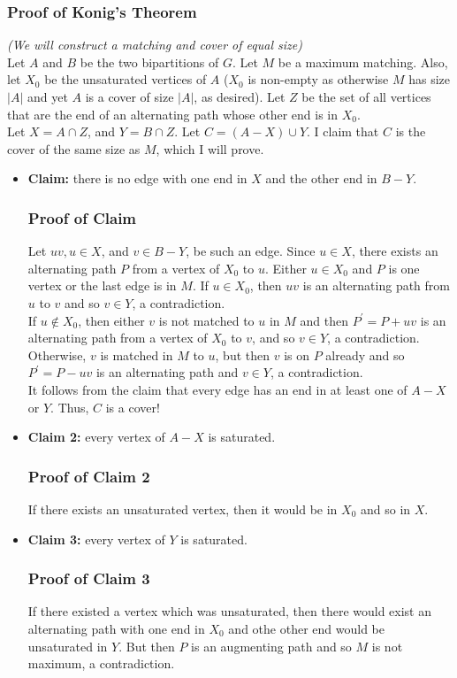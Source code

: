 \documentclass{report}
\begin{document}
\subsubsection{Proof of Konig's Theorem}
\textit{(We will construct a matching and cover of equal size)}\\
Let $A$ and $B$ be the two bipartitions of $G$. Let $M$ be a maximum matching. Also, let $X_0$ be the unsaturated vertices of $A$ ($X_0$ is non-empty as otherwise $M$ has size $|A|$ and yet $A$ is a cover of size $|A|$, as desired). Let $Z$ be the set of all vertices that are the end of an alternating path whose other end is in $X_0$.\\ Let $X = A \cap Z$, and $Y = B \cap Z$. Let $C = (A - X) \cup Y$. I claim that $C$ is the cover of the same size as $M$, which I will prove.
\begin{itemize}
\item \textbf{Claim:} there is no edge with one end in $X$ and the other end in $B-Y$.
\subsubsection{Proof of Claim}
Let $uv, u \in X$, and $v \in B-Y$, be such an edge. Since $u \in X$, there exists an alternating path $P$ from a vertex of $X_0$ to $u$. Either $u \in X_0$ and $P$ is one vertex or the last edge is in $M$. If $u \in X_0$, then $uv$ is an alternating path from $u$ to $v$ and so $v \in Y$, a contradiction.\\
If $u \not\in X_0$, then either $v$ is not matched to $u$ in $M$ and then $P^\prime = P + uv$ is an alternating path from a vertex of $X_0$ to $v$, and so $v \in Y$, a contradiction. Otherwise, $v$ is matched in $M$ to $u$, but then $v$ is on $P$ already and so $P^\prime = P - uv$ is an alternating path and $v \in Y$, a contradiction.\\
It follows from the claim that every edge has an end in at least one of $A-X$ or $Y$. Thus, $C$ is a cover!
\item \textbf{Claim 2:} every vertex of $A-X$ is saturated.
\subsubsection{Proof of Claim 2}
If there exists an unsaturated vertex, then it would be in $X_0$ and so in $X$.
\item \textbf{Claim 3:} every vertex of $Y$ is saturated.
\subsubsection{Proof of Claim 3}
If there existed a vertex which was unsaturated, then there would exist an alternating path with one end in $X_0$ and othe other end would be unsaturated in $Y$. But then $P$ is an augmenting path and so $M$ is not maximum, a contradiction.
\end{itemize}
\end{document}
